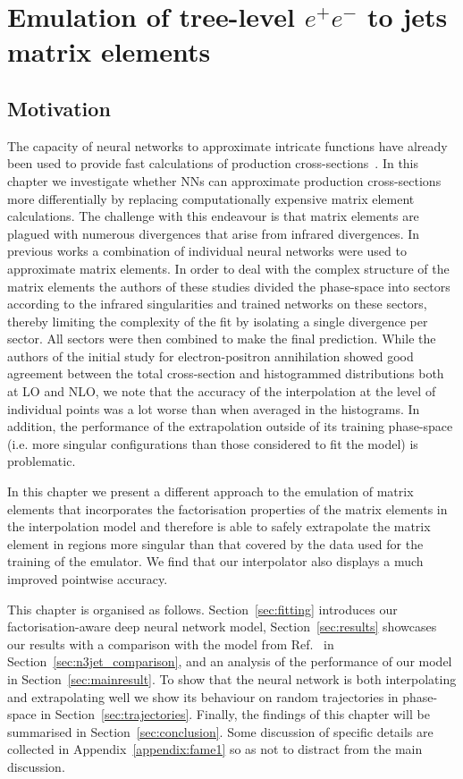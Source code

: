 \documentclass[main.tex]{subfiles}
\begin{document}
\chapter{Emulation of tree-level $e^{+}e^{-}$ to jets matrix elements}
\label{chapter:fame1}

\section{Motivation}
\label{sec:intro}
The capacity of neural networks to approximate intricate functions have already been 
used to provide fast calculations of production cross-sections~\cite{Otten:2018kum,Buckley:2020bxg}.
In this chapter we investigate whether NNs can approximate production cross-sections more differentially by replacing computationally expensive 
matrix element calculations. 
The challenge with this endeavour is that matrix elements are plagued with numerous divergences that arise from infrared divergences.
In previous works \cite{Badger:2020uow,Aylett-Bullock:2021hmo} a combination of individual neural networks were used 
to approximate matrix elements. In order to deal with the complex structure of the matrix elements 
the authors of these studies divided the phase-space into sectors according to the infrared singularities and trained networks on these sectors,
thereby limiting the complexity of the fit by isolating a single divergence per sector. All sectors were then combined to make the final prediction.
While the authors of the initial study for electron-positron annihilation showed good agreement between the total cross-section and histogrammed distributions both at LO and NLO,
we note that the accuracy of the interpolation at the level of individual points was a lot worse than when averaged in the 
histograms. In addition, the performance of the extrapolation outside of its training phase-space 
(i.e. more singular configurations than those considered to fit the model) is problematic.   

In this chapter we present a different approach to the emulation of matrix elements that incorporates the factorisation 
properties of the matrix elements in the interpolation model and therefore is able to safely 
extrapolate the matrix element in regions more singular than that covered by the data used for the training of the emulator. We find
that our interpolator also displays a much improved pointwise accuracy.

This chapter is organised as follows. 
Section~\ref{sec:fitting} introduces our factorisation-aware 
deep neural network model, Section~\ref{sec:results} showcases our results with a comparison with the 
model from Ref.~\cite{Badger:2020uow} in Section~\ref{sec:n3jet_comparison}, and an analysis of the performance of our model in Section~\ref{sec:mainresult}. 
To show that the neural network is both interpolating and extrapolating well we show its 
behaviour on random trajectories in phase-space in Section~\ref{sec:trajectories}. 
Finally, the findings of this chapter will be summarised in Section~\ref{sec:conclusion}.
Some discussion of specific details are collected in Appendix~\ref{appendix:fame1}
so as not to distract from the main discussion.
\end{document}
